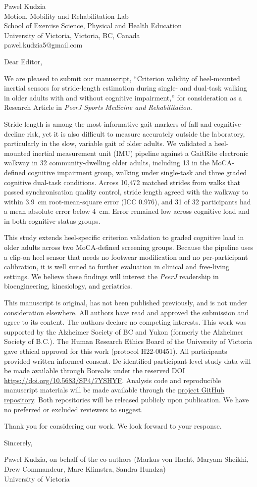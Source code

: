 \documentclass[11pt]{article}
\begin{document}
Pawel Kudzia\\
Motion, Mobility and Rehabilitation Lab\\
School of Exercise Science, Physical and Health Education\\
University of Victoria, Victoria, BC, Canada\\
pawel.kudzia5@gmail.com

\bigskip
Dear Editor,

We are pleased to submit our manuscript, ``Criterion validity of heel-mounted inertial sensors for stride-length estimation during single- and dual-task walking in older adults with and without cognitive impairment,'' for consideration as a Research Article in \textit{PeerJ Sports Medicine and Rehabilitation}.

Stride length is among the most informative gait markers of fall and cognitive-decline risk, yet it is also difficult to measure accurately outside the laboratory, particularly in the slow, variable gait of older adults. We validated a heel-mounted inertial measurement unit (IMU) pipeline against a GaitRite electronic walkway in 32 community-dwelling older adults, including 13 in the MoCA-defined cognitive impairment group, walking under single-task and three graded cognitive dual-task conditions. Across 10{,}472 matched strides from walks that passed synchronisation quality control, stride length agreed with the walkway to within 3.9~cm root-mean-square error (ICC 0.976), and 31 of 32 participants had a mean absolute error below 4~cm. Error remained low across cognitive load and in both cognitive-status groups.

This study extends heel-specific criterion validation to graded cognitive load in older adults across two MoCA-defined screening groups. Because the pipeline uses a clip-on heel sensor that needs no footwear modification and no per-participant calibration, it is well suited to further evaluation in clinical and free-living settings. We believe these findings will interest the \textit{PeerJ} readership in bioengineering, kinesiology, and geriatrics.

This manuscript is original, has not been published previously, and is not under consideration elsewhere. All authors have read and approved the submission and agree to its content. The authors declare no competing interests. This work was supported by the Alzheimer Society of BC and Yukon (formerly the Alzheimer Society of B.C.). The Human Research Ethics Board of the University of Victoria gave ethical approval for this work (protocol H22-00451). All participants provided written informed consent. De-identified participant-level study data will be made available through Borealis under the reserved DOI \url{https://doi.org/10.5683/SP4/7YSHYF}. Analysis code and reproducible manuscript materials will be made available through the \href{https://github.com/pkudzia/manuscript-heel-imu-stride-length-validation}{project GitHub repository}. Both repositories will be released publicly upon publication. We have no preferred or excluded reviewers to suggest.

Thank you for considering our work. We look forward to your response.

\bigskip
Sincerely,

\medskip
Pawel Kudzia, on behalf of the co-authors (Markus von Hacht, Maryam Sheikhi, Drew Commandeur, Marc Klimstra, Sandra Hundza)\\
University of Victoria
\end{document}
